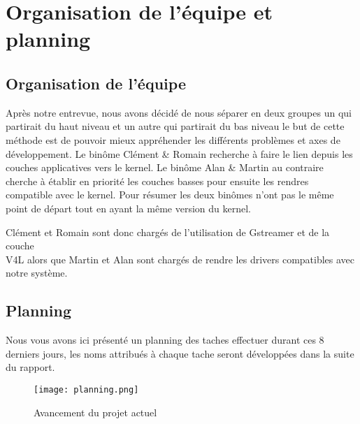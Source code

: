 
\chapter{Organisation de l'équipe et planning} %

\label{Chapter1} %


\section{Organisation de l'équipe}

Après notre entrevue, nous avons décidé de nous séparer en deux groupes un qui partirait
du haut niveau et un autre qui partirait du bas niveau le but de cette méthode est de
pouvoir mieux appréhender les différents problèmes et axes de développement. Le binôme
Clément \& Romain recherche à faire le lien depuis les couches applicatives vers le kernel.
Le binôme Alan \& Martin au contraire cherche à établir en priorité les couches basses pour
ensuite les rendres compatible avec le kernel. Pour résumer les deux binômes n’ont pas le
même point de départ tout en ayant la même version du kernel.

Clément et Romain sont donc chargés de l’utilisation de Gstreamer et de la couche \\ V4L
alors que Martin et Alan sont chargés de rendre les drivers compatibles avec notre système.

\section{Planning}

Nous vous avons ici présenté un planning des taches effectuer durant ces 8 \\
derniers jours, les noms attribués à chaque tache seront développées dans la suite du rapport. 

\begin{figure}[th]
    \centering
    \texttt{[image: planning.png]}
    \decoRule
    \caption{Avancement du projet actuel}  \label{fig:planning}   
\end{figure}

